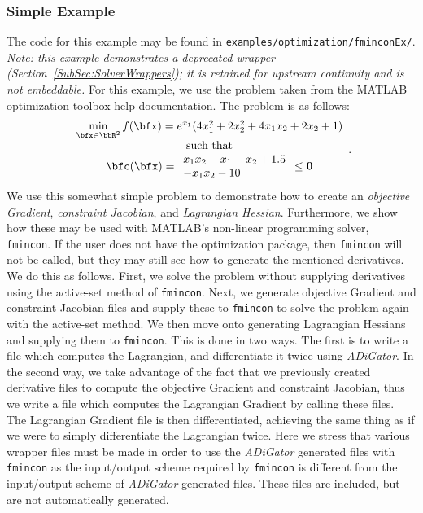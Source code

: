 \documentclass[10pt,pdftex]{article}
\begin{document}
\subsubsection{Simple Example}
The code for this example may be found in \texttt{examples/optimization/fminconEx/}. \emph{Note: this example demonstrates a deprecated wrapper (Section~\ref{SubSec:SolverWrappers}); it is retained for upstream continuity and is not embeddable.}
For this example, we use the problem taken from the MATLAB optimization toolbox help documentation. The problem is as follows:
\begin{equation}
\begin{array}{c}
\min\limits_{\bfx \in \bbR^2}  f(\bfx) = e^{x_1}(4x_1^2+2x_2^2+4x_1x_2+2x_2+1)\\
\text{such that}\\
\bfc(\bfx) = 
\begin{array}{ll}
x_1x_2 - x_1-x_2+1.5 \\
-x_1x_2-10
\end{array} \leq \textbf{0}
\end{array}.
\end{equation}
We use this somewhat simple problem to demonstrate how to create an \emph{objective Gradient}, \emph{constraint Jacobian}, and \emph{Lagrangian Hessian}. Furthermore, we show how these may be used with MATLAB's non-linear programming solver, \texttt{fmincon}. If the user does not have the optimization package, then \texttt{fmincon} will not be called, but they may still see how to generate the mentioned derivatives. We do this as follows. First, we solve the problem without supplying derivatives using the active-set method of \texttt{fmincon}. Next, we generate objective Gradient and constraint Jacobian files and supply these to \texttt{fmincon} to solve the problem again with the active-set method. We then move onto generating Lagrangian Hessians and supplying them to \texttt{fmincon}. This is done in two ways. The first is to write a file which computes the Lagrangian, and differentiate it twice using \emph{ADiGator}. In the second way, we take advantage of the fact that we previously created derivative files to compute the objective Gradient and constraint Jacobian, thus we write a file which computes the Lagrangian Gradient by calling these files. The Lagrangian Gradient file is then differentiated, achieving the same thing as if we were to simply differentiate the Lagrangian twice.
Here we stress that various wrapper files must be made in order to use the \emph{ADiGator} generated files with \texttt{fmincon} as the input/output scheme required by \texttt{fmincon} is different from the input/output scheme of \emph{ADiGator} generated files. These files are included, but are not automatically generated.
\end{document}
